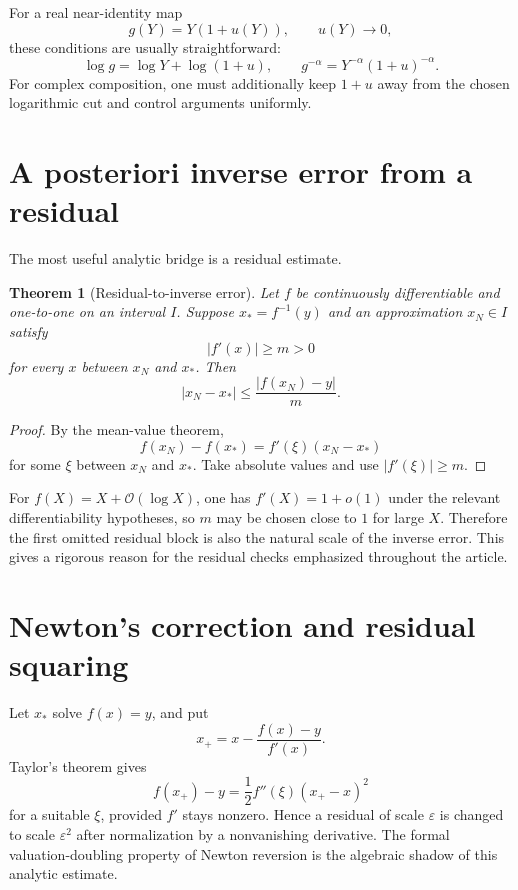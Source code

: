 \documentclass[11pt,oneside]{book}
\newtheorem{theorem}{Theorem}[chapter]
\theoremstyle{definition}
\theoremstyle{remark}
\newcommand{\bigO}{\mathcal O}
\begin{document}
For a real near-identity map
\[
 g(Y)=Y(1+u(Y)),\qquad u(Y)\to0,
\]
these conditions are usually straightforward:
\[
 \log g=\log Y+\log(1+u),\qquad
 g^{-\alpha}=Y^{-\alpha}(1+u)^{-\alpha}.
\]
For complex composition, one must additionally keep $1+u$ away from the
chosen logarithmic cut and control arguments uniformly.

\section{A posteriori inverse error from a residual}
The most useful analytic bridge is a residual estimate.

\begin{theorem}[Residual-to-inverse error]\label{thm:residual-inverse}
Let $f$ be continuously differentiable and one-to-one on an interval $I$.
Suppose $x_\ast=f^{-1}(y)$ and an approximation $x_N\in I$ satisfy
\[
 |f'(x)|\ge m>0
\]
for every $x$ between $x_N$ and $x_\ast$. Then
\begin{equation}\label{eq:residual-error}
 |x_N-x_\ast|
 \le \frac{|f(x_N)-y|}{m}.
\end{equation}
\end{theorem}

\begin{proof}
By the mean-value theorem,
\[
 f(x_N)-f(x_\ast)=f'(\xi)(x_N-x_\ast)
\]
for some $\xi$ between $x_N$ and $x_\ast$. Take absolute values and use
$|f'(\xi)|\ge m$.
\end{proof}

For $f(X)=X+\bigO(\log X)$, one has $f'(X)=1+o(1)$ under the relevant
differentiability hypotheses, so $m$ may be chosen close to $1$ for large
$X$. Therefore the first omitted residual block is also the natural scale
of the inverse error. This gives a rigorous reason for the residual checks
emphasized throughout the article.

\section{Newton's correction and residual squaring}
Let $x_\ast$ solve $f(x)=y$, and put
\[
 x_+=x-\frac{f(x)-y}{f'(x)}.
\]
Taylor's theorem gives
\[
 f(x_+)-y
 =\frac12f''(\xi)(x_+-x)^2
\]
for a suitable $\xi$, provided $f'$ stays nonzero. Hence a residual of
scale $\varepsilon$ is changed to scale $\varepsilon^2$ after normalization
by a nonvanishing derivative. The formal valuation-doubling property of
Newton reversion is the algebraic shadow of this analytic estimate.
\end{document}
